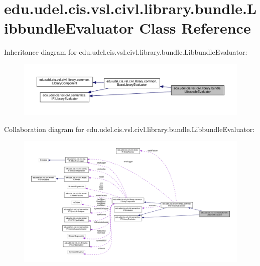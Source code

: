 \hypertarget{classedu_1_1udel_1_1cis_1_1vsl_1_1civl_1_1library_1_1bundle_1_1LibbundleEvaluator}{}\section{edu.\+udel.\+cis.\+vsl.\+civl.\+library.\+bundle.\+Libbundle\+Evaluator Class Reference}
\label{classedu_1_1udel_1_1cis_1_1vsl_1_1civl_1_1library_1_1bundle_1_1LibbundleEvaluator}


Inheritance diagram for edu.\+udel.\+cis.\+vsl.\+civl.\+library.\+bundle.\+Libbundle\+Evaluator\+:
\nopagebreak
\begin{figure}[H]
\begin{center}
\leavevmode
\includegraphics[width=350pt]{classedu_1_1udel_1_1cis_1_1vsl_1_1civl_1_1library_1_1bundle_1_1LibbundleEvaluator__inherit__graph}
\end{center}
\end{figure}


Collaboration diagram for edu.\+udel.\+cis.\+vsl.\+civl.\+library.\+bundle.\+Libbundle\+Evaluator\+:
\nopagebreak
\begin{figure}[H]
\begin{center}
\leavevmode
\includegraphics[width=350pt]{classedu_1_1udel_1_1cis_1_1vsl_1_1civl_1_1library_1_1bundle_1_1LibbundleEvaluator__coll__graph}
\end{center}
\end{figure}
